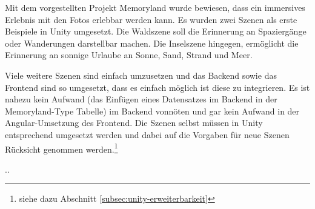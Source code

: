 


Mit dem vorgestellten Projekt Memoryland wurde bewiesen, dass ein immersives Erlebnis mit den Fotos erlebbar werden kann. Es wurden zwei Szenen als erste Beispiele in Unity umgesetzt. Die Waldszene soll die Erinnerung an Spaziergänge oder Wanderungen darstellbar machen. Die Inselszene hingegen, ermöglicht die Erinnerung an sonnige Urlaube an Sonne, Sand, Strand und Meer.

Viele weitere Szenen sind einfach umzusetzen und das Backend sowie das Frontend sind so umgesetzt, dass es einfach möglich ist diese zu integrieren. Es ist nahezu kein Aufwand (das Einfügen eines Datensatzes im Backend in der Memoryland-Type Tabelle) im Backend vonnöten und gar kein Aufwand in der Angular-Umsetzung des Frontend. Die Szenen selbst müssen in Unity entsprechend umgesetzt werden und dabei auf die Vorgaben für neue Szenen Rücksicht genommen werden.\footnote{siehe dazu Abschnitt \ref{subsec:unity-erweiterbarkeit}}

..


